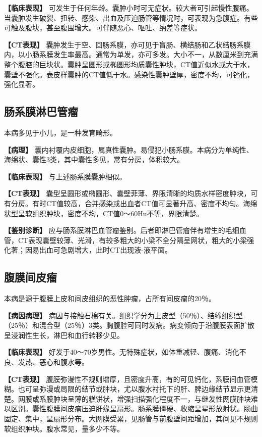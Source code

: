 \textbf{【临床表现】}
可发生于任何年龄。囊肿小时可无症状。较大者可引起慢性腹痛。当囊肿发生破裂、扭转、感染、出血及压迫肠管等情况时，可表现为急腹症。有些可触及腹块，甚至腹围增大。可伴随恶心、呕吐、纳差等症状。

\textbf{【CT表现】}
囊肿发生于空、回肠系膜，亦可见于盲肠、横结肠和乙状结肠系膜内，以小肠系膜发生率最高。通常为单发，亦可多发。大小不一，从数厘米到充满整个腹腔的巨块状。囊肿呈圆形或椭圆形均质囊性肿块，CT值近似水或大于水，囊壁不强化。表皮样囊肿的CT值低于水。感染性囊肿壁厚，密度不均，可钙化，强化显著。

\subsection{肠系膜淋巴管瘤}

本病多见于小儿，是一种发育畸形。

\textbf{【病理】}
囊内衬覆内皮细胞，属真性囊肿。易侵犯小肠系膜。本病分为单纯性、海绵状、囊性3类，其中囊性多见，常有分房，体积较大。

\textbf{【临床表现】} 与上述肠系膜囊肿相似。

\textbf{【CT表现】}
囊型呈圆形或椭圆形、囊壁菲薄、界限清晰的均质水样密度肿块，可有分房。有时CT值较高，合并感染或出血者CT值可显著升高、密度不均匀。海绵状型呈软组织肿块，密度不均，CT值0～60Hu不等，界限清楚。

\textbf{【鉴别诊断】}
应与肠系膜淋巴血管瘤鉴别。后者即淋巴管瘤伴有增生的毛细血管，CT表现囊壁较薄、光滑，有较多粗大的小梁不全分隔呈网状，粗大的小梁强化著；因易出血可急剧增大，此时CT出现液-液平面。

\subsection{腹膜间皮瘤}

本病是源于腹膜上皮和间皮组织的恶性肿瘤，占所有间皮瘤的20％。

\textbf{【病因病理】}
病因与接触石棉有关。组织学分为上皮型（50％）、结缔组织型（25％）和混合型（25％）3类。胸腹腔可同时发病。病变倾向于沿腹膜表面扩散呈浸润性生长，淋巴和血行转移少见。

\textbf{【临床表现】}
好发于40～70岁男性。无特殊症状，如体重减轻、腹痛、消化不良、发热、恶心和腹水等。

\textbf{【CT表现】}
腹膜弥漫性不规则增厚，且密度升高，有的可见钙化，系膜间血管模糊。也可呈弥漫或局限的结节或肿块，尤以腹水衬托下的肝、脾边缘结节显示更清楚。网膜或系膜肿块呈薄的糕饼状，增强扫描强化程度不一，与继发性网膜肿块难以区别。囊性腹膜间皮瘤压迫肝缘呈扇形。肠系膜僵硬、收缩呈星形放射状。肠曲固定、集中，呈扇形分布。大网膜受累，见肠管与前腹壁间距增加，其间见不规则软组织肿块。腹水常见，量多少不等。

